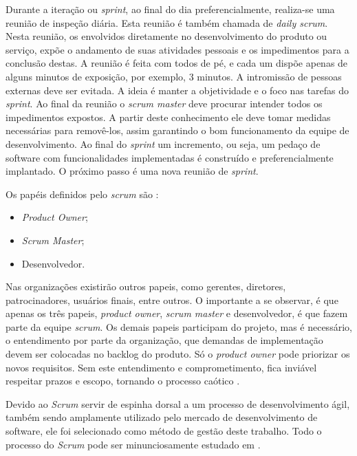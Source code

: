 Durante a iteração ou \emph{sprint}, ao final do dia preferencialmente, realiza-se uma reunião de inspeção diária. 
Esta reunião é também chamada de \emph{daily scrum}. 
Nesta reunião, os envolvidos diretamente no desenvolvimento do produto ou serviço, expõe o andamento de suas atividades pessoais e os impedimentos para a conclusão destas. 
A reunião é feita com todos de pé, e cada um dispõe apenas de alguns minutos de exposição, por exemplo, 3 minutos. 
A intromissão de pessoas externas deve ser evitada. 
A ideia é manter a objetividade e o foco nas tarefas do \emph{sprint}.
Ao final da reunião o \emph{scrum master} deve procurar intender todos os impedimentos expostos. A partir deste conhecimento ele deve tomar medidas necessárias para removê-los, assim garantindo o bom funcionamento da equipe de desenvolvimento.
Ao final do \emph{sprint} um incremento, ou seja, um pedaço de software com funcionalidades implementadas é construído e preferencialmente implantado. O próximo passo é uma nova reunião de \emph{sprint}.

Os papéis definidos pelo \emph{scrum} são \cite{Schwaber2004}:
\begin{itemize}	
	\item \emph{Product Owner};
	\item \emph{Scrum Master};
	\item Desenvolvedor.
\end{itemize}

Nas organizações existirão outros papeis, como gerentes, diretores, patrocinadores, usuários finais, entre outros. 
O importante a se observar, é que apenas os três papeis, \emph{product owner}, \emph{scrum master} e desenvolvedor, é que fazem parte da equipe \emph{scrum}. 
Os demais papeis participam do projeto, mas é necessário, o entendimento por parte da organização, que demandas de implementação devem ser colocadas no backlog do produto. 
Só o \emph{product owner} pode priorizar os novos requisitos. 
Sem este entendimento e comprometimento, fica inviável respeitar prazos e escopo, tornando o processo caótico \cite{Schwaber2004}.

Devido ao \emph{Scrum} servir de espinha dorsal a um processo de desenvolvimento ágil, também sendo amplamente utilizado pelo mercado de desenvolvimento de software, ele foi selecionado como método de gestão deste trabalho. 
Todo o processo do \emph{Scrum} pode ser minunciosamente estudado em .


